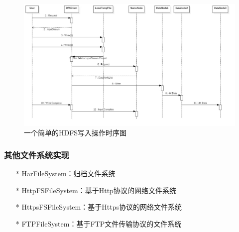         \begin{figure}[h]
            \centering
            \includegraphics[width=1\linewidth]{HDFSInputTime}
            \caption{一个简单的HDFS写入操作时序图}
            \label{fig:HDFS Input Time}
        \end{figure}


    \subsubsection{其他文件系统实现}
        \begin{itemize}
            \item[*] HarFileSystem：归档文件系统
            \item[*] HttpFSFileSystem：基于Http协议的网络文件系统
            \item[*] HttpsFSFileSystem：基于Https协议的网络文件系统
            \item[*] FTPFileSystem：基于FTP文件传输协议的文件系统
        \end{itemize}


\endinput